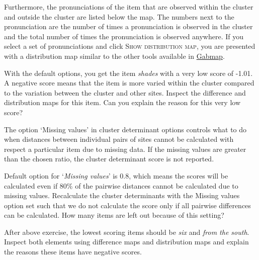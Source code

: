 \documentclass{article}
\newcommand{\gabmap}{\href{http://www.gabmap.nl/}{Gabmap}}
\begin{document}
Furthermore, the pronunciations of the item that are observed within
the cluster and outside the cluster are listed below the map. The
numbers next to the pronunciation are the number of times a
pronunciation is observed in the cluster and the total number of times
the pronunciation is observed anywhere. If you select a set of
pronunciations and click \textsc{Show distribution map}, you are
presented with a distribution map similar to the other tools available
in \gabmap{}.

\begin{Exercise}
With the default options, you get the item \emph{shades} with a very
low score of -1.01. A negative score means that the item is more
varied within the cluster compared to the variation between the
cluster and other sites. Inspect the difference and distribution maps
for this item. Can you explain the reason for this very low score?
\end{Exercise}

The option `Missing values' in cluster determinant options controls
what to do when distances between individual pairs of sites cannot be
calculated with respect a particular item due to missing data. If the
missing values are greater than the chosen ratio, the cluster
determinant score is not reported. 

\begin{Exercise}
Default option for `\emph{Missing values}' is 0.8, which means the scores
will be calculated even if 80\% of the pairwise distances cannot be
calculated due to missing values. Recalculate the cluster determinants
with the Missing values option set such that we do not calculate the
score only if all pairwise differences can be calculated. How many
items are left out because of this setting?
\end{Exercise}

\begin{Exercise}
After above exercise, the lowest scoring items should be \emph{six}
and \emph{from the south}. Inspect both elements using difference maps
and distribution maps and explain the reasons these items have
negative scores.
\end{Exercise}
\end{document}
